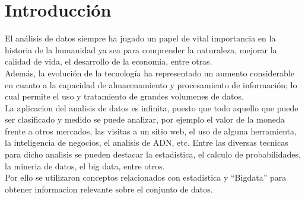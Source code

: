 \section{Introducción}
	El análisis de datos siempre ha jugado un papel de vital importancia en la historia de la humanidad ya sea para comprender la naturaleza, mejorar la calidad de vida, el desarrollo de la economia, entre otras.\\
	Además, la evolución de la tecnología ha representado un aumento considerable en cuanto a la capacidad de almacenamiento y procesamiento de información; lo cual permite el uso y tratamiento de grandes volumenes de datos.\\
	La aplicacion del analisis de datos es infinita, puesto que todo aquello que puede ser clasificado y medido se puede analizar, por ejemplo el valor de la moneda frente a otros mercados, las visitas a un sitio web, el uso de alguna herramienta, la inteligencia de negocios, el analisis de ADN, etc.
	Entre las diversas tecnicas para dicho analisis se pueden destacar la estadistica, el calculo de probabilidades, la mineria de datos, el big data, entre otros.\\
	Por ello se utilizaron conceptos relacionados con estadistica y ``Bigdata'' para obtener informacion relevante sobre el conjunto de datos.
